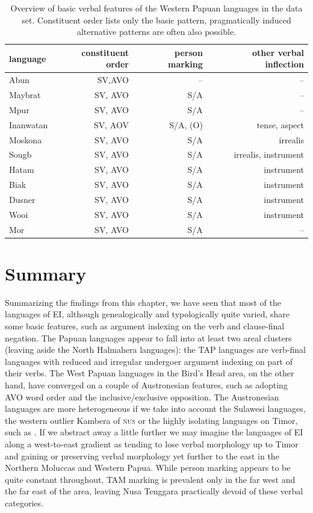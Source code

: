 \begin{table}[h]

\begin{footnotesize}
\begin{tabular}{l r r r}
\hline\hline
language & constituent order & person marking & other verbal inflection \tabularnewline
\hline
Abun & SV,AVO & -- & -- \tabularnewline
Maybrat & SV, AVO & S/A & -- \tabularnewline
Mpur & SV, AVO & S/A & -- \tabularnewline
Inanwatan & SV, AOV & S/A, (O) & tense, aspect \tabularnewline
\hline
Moskona & SV, AVO & S/A & irrealis \tabularnewline
Sougb & SV, AVO & S/A & irrealis, instrument \tabularnewline
Hatam & SV, AVO & S/A & instrument \tabularnewline
\hline
Biak & SV, AVO & S/A & instrument \tabularnewline
Dusner & SV, AVO & S/A & instrument \tabularnewline
Wooi & SV, AVO & S/A & instrument \tabularnewline
Mor & SV, AVO & S/A & -- \tabularnewline
\hline
\end{tabular}
\caption[Basic verbal features of the Western Papuan languages]{Overview of basic verbal features of the Western Papuan languages in the data set. Constituent order lists only the basic pattern, pragmatically induced alternative patterns are often also possible.}
\label{table:overviewpapua}
\end{footnotesize}

\end{table}

\section{Summary}

Summarizing the findings from this chapter, we have seen that most of the languages of EI, although genealogically and typologically quite varied, share some basic features, such as argument indexing on the verb and clause-final negation. The Papuan languages appear to fall into at least two areal clusters (leaving aside the North Halmahera languages): the TAP languages are verb-final languages with reduced and irregular undergoer argument indexing on part of their verbs. The West Papuan languages in the Bird's Head area, on the other hand, have converged on a couple of Austronesian features, such as adopting AVO word order and the inclusive/exclusive opposition. The Austronesian languages are more heterogeneous if we take into account the Sulawesi languages, the western outlier Kambera of \textsc{nus} or the highly isolating languages on Timor, such as . If we abstract away a little further we may imagine the languages of EI along a west-to-east gradient as tending to lose verbal morphology up to Timor and gaining or preserving verbal morphology yet further to the east in the Northern Moluccas and Western Papua. While person marking appears to be quite constant throughout, TAM marking is prevalent only in the far west and the far east of the area, leaving Nusa Tenggara practically devoid of these verbal categories.

